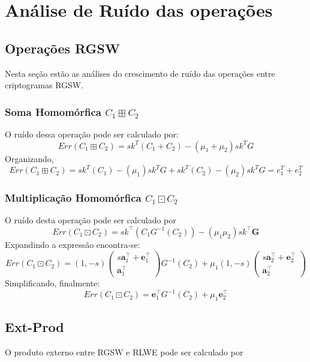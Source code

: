 \section{Análise de Ruído das operações}

\subsection{Operações RGSW}
Nesta seção estão as análises do crescimento de ruído das operações entre criptogramas RGSW.
\subsubsection{Soma Homomórfica $C_1 \boxplus  C_2$}
O ruído dessa operação pode ser calculado por:
$$
Err(C_1 \boxplus  C_2) = sk^T(C_1 + C_2) - (\mu_1 + \mu_2)sk^TG
$$
Organizando,
$$
Err(C_1 \boxplus  C_2) = sk^T(C_1) - (\mu_1)sk^TG + sk^T(C_2) - (\mu_2)sk^TG = e_1^T + e_2^T 
$$

\subsubsection{Multiplicação Homomórfica $C_1 \boxdot C_2$}
O ruído desta operação pode ser calculado por
$$
Err(C_1 \boxdot C_2) = sk^\top(C_1G ^{-1}(C_2)) - (\mu_1\mu_2)sk^\top \mathbf{G}
$$
Expandindo a expressão encontra-se:
$$
Err(C_1 \boxdot C_2) = (1,-s) \begin{pmatrix} s \mathbf{a}_1^\top + \mathbf{e}_1^\top \\ \mathbf{a}_ 1^\top \end{pmatrix}G ^{-1}(C_2) + \mu_1(1,-s)\begin{pmatrix} s \mathbf{a}_2^\top + \mathbf{e}_2^\top \\ \mathbf{a}_ 2^\top \end{pmatrix}
$$
Simplificando, finalmente:
$$
Err(C_1 \boxdot C_2) = \mathbf{e}_1^\top G ^{-1}(C_2) + \mu_1 \mathbf{e}_2^\top
$$

\subsection{Ext-Prod}
O produto externo entre RGSW e RLWE pode ser calculado por

